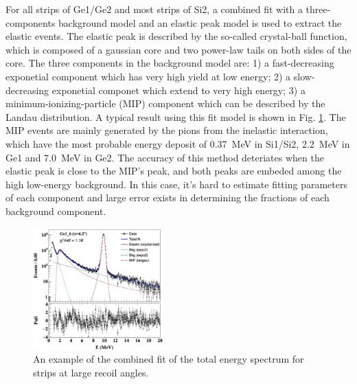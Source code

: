 \documentclass[fleqn,twocolumn,a4paper]{ikpar}
\begin{document}
For all strips of Ge1/Ge2 and most strips of Si2, a combined fit with
a three-components background model and an elastic peak model is used to extract
the elastic events.
The elastic peak is described by the so-called crystal-ball function, which
is composed of a gaussian core and two power-law tails on both sides of the core.
The three components in the background model are: 1) a
fast-decreasing exponetial component which has very high yield at low energy; 2)
a slow-decreasing exponetial componet which extend to very high energy; 3) a
minimum-ionizing-particle (MIP) component which can be described by the Landau
distribution.
A typical result using this fit model is shown in Fig. \ref{fig:combined_fit}.
The MIP events are mainly generated by the pions from the inelastic interaction,
which have the most probable energy deposit of \SI{0.37}{\MeV} in Si1/Si2,
\SI{2.2}{\MeV} in Ge1 and \SI{7.0}{\MeV} in Ge2.
The accuracy of this method deteriates when the elastic peak is close to the MIP's
peak, and both peaks are embeded among the high low-energy background.
In this case, it's hard to estimate fitting parameters of each component and large
error exists in determining the fractions of each background component.
\begin{figure}[!htb]
	\includegraphics[width=0.45\textwidth]{./combined_fit.png}
  \caption{An example of the combined fit of the total energy spectrum for strips at large recoil angles.}
  \label{fig:combined_fit}
\end{figure}

\par
\medskip
\end{document}
